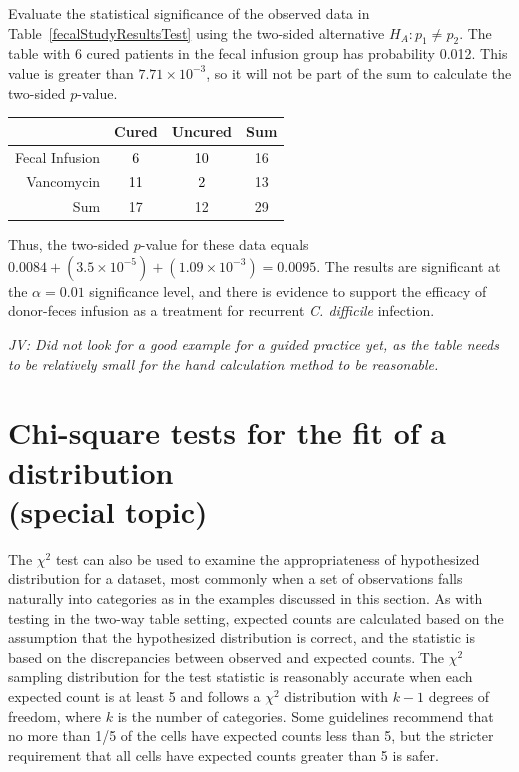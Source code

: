 \begin{example}{Evaluate the statistical significance of the observed data in Table~\ref{fecalStudyResultsTest} using the two-sided alternative $H_A: p_1 \neq p_2$.}
The table with 6 cured patients in the fecal infusion group has probability 0.012. This value is greater than $7.71 \times 10^{-3}$, so it will not be part of the sum to calculate the two-sided $p$-value.
	
\begin{table}[h]
	\centering
	\color{gray}
	\begin{tabular}{r|cc|c}
		\hline
		& Cured & Uncured & Sum \\ 
		\hline
		Fecal Infusion & \textcolor{black}{6} & \textcolor{black}{10} & 16 \\ 
		Vancomycin & \textcolor{black}{11} & \textcolor{black}{2} & 13 \\ 
		\hline
		Sum & 17 & 12 & 29 \\ 
		\hline
	\end{tabular}
\end{table}	

Thus, the two-sided $p$-value for these data equals $0.0084 + (3.5 \times 10^{-5}) + (1.09 \times 10^{-3}) = 0.0095$. The results are significant at the $\alpha = 0.01$ significance level, and there is evidence to support the efficacy of donor-feces infusion as a treatment for recurrent \textit{C. difficile} infection.

\end{example}

\textit{JV: Did not look for a good example for a guided practice yet, as the table needs to be relatively small for the hand calculation method to be reasonable.}


\section[Chi-square tests for the fit of a distribution. (special topic)]{Chi-square tests for the fit of a distribution \\(special topic)}
\label{oneWayChiSquare}

The $\chi^2$ test can also be used to examine the appropriateness of hypothesized distribution for a dataset, most commonly when a set of observations falls naturally into categories as in the examples discussed in this section. As with testing in the two-way table setting, expected counts are calculated based on the assumption that the hypothesized distribution is correct, and the statistic is based on the discrepancies between observed and expected counts. The  $\chi^2$ sampling distribution for the test statistic is reasonably accurate when each expected count is at least 5 and follows a $\chi^2$ distribution with $k-1$ degrees of freedom, where $k$ is the number of categories.  Some guidelines recommend that no more than 1/5 of the cells have expected counts less than 5, but the stricter requirement that all cells have expected counts greater than 5 is safer.

